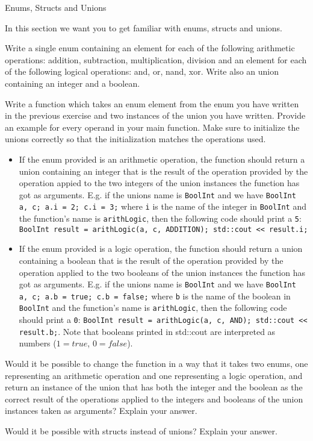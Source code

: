 \documentclass[12pt,a4paper]{scrartcl}
\begin{document}
\begin{aufgabe}[8]{Enums, Structs and Unions}

In this section we want you to get familiar with enums, structs and unions.

	\begin{teilaufgabe}[2]
Write a single enum containing an element for each of the following arithmetic operations: addition, subtraction, multiplication, division and an element for each of the following logical operations: and, or, nand, xor. Write also an union containing an integer and a boolean.
	\end{teilaufgabe}

	\begin{teilaufgabe}[4]
Write a function which takes an enum element from the enum you have written in the previous exercise and two instances of the union you have written. Provide an example for every operand in your main function. Make sure to initialize the unions correctly so that the initialization matches the operations used.
\begin{itemize}
    \item If the enum provided is an arithmetic operation, the function should return a union containing an integer that is the result of the operation provided by the operation appied to the two integers of the union instances the function has got as arguments. E.g. if the unions name is \texttt{BoolInt} and we have \texttt{BoolInt a, c; a.i = 2; c.i = 3;} where \texttt{i} is the name of the integer in \texttt{BoolInt} and the function's name is \texttt{arithLogic}, then the following code should print a \texttt{5}: \texttt{BoolInt result = arithLogic(a, c, ADDITION); std::cout << result.i;}
    \item If the enum provided is a logic operation, the function should return a union containing a boolean that is the result of the operation provided by the operation applied to the two booleans of the union instances the function has got as arguments. E.g. if the unions name is \texttt{BoolInt} and we have \texttt{BoolInt a, c; a.b = true; c.b = false;} where \texttt{b} is the name of the boolean in \texttt{BoolInt} and the function's name is \texttt{arithLogic}, then the following code should print a \texttt{0}: \texttt{BoolInt result = arithLogic(a, c, AND); std::cout << result.b;}. Note that booleans printed in std::cout are interpreted as numbers ($1=true$, $0=false$).
\end{itemize}
	\end{teilaufgabe}
        \begin{teilaufgabe}[1]
Would it be possible to change the function in a way that it takes two enums, one representing an arithmetic operation and one representing a logic operation, and return an instance of the union that has both the integer and the boolean as the correct result of the operations applied to the integers and booleans of the union instances taken as arguments? Explain your answer.
	\end{teilaufgabe}
        \begin{teilaufgabe}[1]
Would it be possible with structs instead of unions? Explain your answer.
        \end{teilaufgabe}
 

\end{aufgabe}
\end{document}
